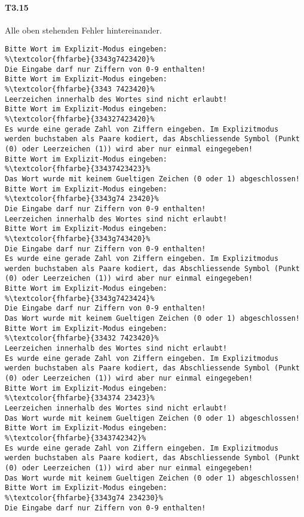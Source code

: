 \paragraph*{T3.15} Alle oben stehenden Fehler hintereinander.
\begin{lstlisting}[escapechar=\%]
Bitte Wort im Explizit-Modus eingeben:
%\textcolor{fhfarbe}{3343g7423420}%
Die Eingabe darf nur Ziffern von 0-9 enthalten!
Bitte Wort im Explizit-Modus eingeben:
%\textcolor{fhfarbe}{3343 7423420}%
Leerzeichen innerhalb des Wortes sind nicht erlaubt!
Bitte Wort im Explizit-Modus eingeben:
%\textcolor{fhfarbe}{334327423420}%
Es wurde eine gerade Zahl von Ziffern eingeben. Im Explizitmodus werden buchstaben als Paare kodiert, das Abschliessende Symbol (Punkt (0) oder Leerzeichen (1)) wird aber nur einmal eingegeben!
Bitte Wort im Explizit-Modus eingeben:
%\textcolor{fhfarbe}{33437423423}%
Das Wort wurde mit keinem Gueltigen Zeichen (0 oder 1) abgeschlossen!
Bitte Wort im Explizit-Modus eingeben:
%\textcolor{fhfarbe}{3343g74 23420}%
Die Eingabe darf nur Ziffern von 0-9 enthalten!
Leerzeichen innerhalb des Wortes sind nicht erlaubt!
Bitte Wort im Explizit-Modus eingeben:
%\textcolor{fhfarbe}{3343g743420}%
Die Eingabe darf nur Ziffern von 0-9 enthalten!
Es wurde eine gerade Zahl von Ziffern eingeben. Im Explizitmodus werden buchstaben als Paare kodiert, das Abschliessende Symbol (Punkt (0) oder Leerzeichen (1)) wird aber nur einmal eingegeben!
Bitte Wort im Explizit-Modus eingeben:
%\textcolor{fhfarbe}{3343g7423424}%
Die Eingabe darf nur Ziffern von 0-9 enthalten!
Das Wort wurde mit keinem Gueltigen Zeichen (0 oder 1) abgeschlossen!
Bitte Wort im Explizit-Modus eingeben:
%\textcolor{fhfarbe}{33432 7423420}%
Leerzeichen innerhalb des Wortes sind nicht erlaubt!
Es wurde eine gerade Zahl von Ziffern eingeben. Im Explizitmodus werden buchstaben als Paare kodiert, das Abschliessende Symbol (Punkt (0) oder Leerzeichen (1)) wird aber nur einmal eingegeben!
Bitte Wort im Explizit-Modus eingeben:
%\textcolor{fhfarbe}{334374 23423}%
Leerzeichen innerhalb des Wortes sind nicht erlaubt!
Das Wort wurde mit keinem Gueltigen Zeichen (0 oder 1) abgeschlossen!
Bitte Wort im Explizit-Modus eingeben:
%\textcolor{fhfarbe}{3343742342}%
Es wurde eine gerade Zahl von Ziffern eingeben. Im Explizitmodus werden buchstaben als Paare kodiert, das Abschliessende Symbol (Punkt (0) oder Leerzeichen (1)) wird aber nur einmal eingegeben!
Das Wort wurde mit keinem Gueltigen Zeichen (0 oder 1) abgeschlossen!
Bitte Wort im Explizit-Modus eingeben:
%\textcolor{fhfarbe}{3343g74 234230}%
Die Eingabe darf nur Ziffern von 0-9 enthalten!

\end{lstlisting}
